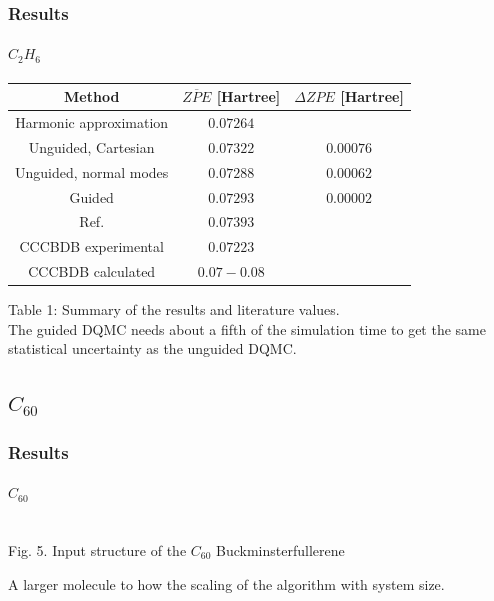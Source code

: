 \documentclass[16pt]{beamer}
\begin{document}
\begin{frame}
\frametitle{Results}
\framesubtitle{$C_2 H_6$}
\begin{table}[h]
\centering
 \begin{tabular}{||c | c | c||} 
 \hline
 Method & $\overline{ZPE}$ [Hartree] & $\Delta ZPE$ [Hartree] \\ [0.5ex] 
 \hline\hline
 Harmonic approximation & $0.07264$ & \\
 \hline
 Unguided, Cartesian & $0.07322$ &  $0.00076$\\
  \hline
 Unguided, normal modes & $0.07288$ &  $0.00062$\\
 \hline
 Guided & $0.07293$ & $0.00002$ \\
 \hline
 Ref. \cite{c2h6} & $0.07393$ &\\
 \hline
 CCCBDB experimental & $0.07223$ & \\
 \hline
 CCCBDB calculated & $0.07 - 0.08$ & \\
 \hline
\end{tabular}
\end{table}
Table 1: Summary of the results and literature values.\\
The guided DQMC needs about a fifth of the simulation time to get the same statistical uncertainty as the unguided DQMC. 
\end{frame}

\subsection{$C_{60}$}

\begin{frame}
\frametitle{Results}
\framesubtitle{$C_{60}$}
\begin{center}
\\
Fig. 5. Input structure of the $C_{60}$ Buckminsterfullerene
\end{center}
A larger molecule to how the scaling of the algorithm with system size.
\end{frame}
\end{document}
